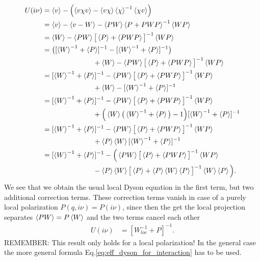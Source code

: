 \documentclass[12pt,a4paper]{scrartcl}
\numberwithin{equation}{section}
\begin{document}
\begin{align}
 U(i\nu) 
 &= \braket{v} - \left( \braket{ v \chi v } - \braket{v \chi} \braket{\chi}^{-1} \braket{\chi v} \right) \\
% 
 &= \braket{v} - \braket{v -W} - \braket{PW} \braket{P+PWP}^{-1} \braket{WP}  \\
%
 &= \braket{W} - \braket{PW} \big[ \braket{P}+\braket{PWP} \big]^{-1} \braket{WP}  \\
%
 &= \big( [\braket{W}^{-1}+\braket{P}]^{-1} -[\braket{W}^{-1}+\braket{P}]^{-1} \big) \nonumber \\
     & \hspace{2.5cm} +\braket{W} - \braket{PW} \big[ \braket{P}+\braket{PWP} \big]^{-1} \braket{WP}  \\
%
 &= [\braket{W}^{-1}+\braket{P}]^{-1} - \braket{PW} \big[ \braket{P}+\braket{PWP} \big]^{-1} \braket{WP} \nonumber \\
     & \hspace{2.5cm} +\braket{W} -[\braket{W}^{-1}+\braket{P}]^{-1}   \\
% 
 &= [\braket{W}^{-1}+\braket{P}]^{-1} - \braket{PW} \big[ \braket{P}+\braket{PWP} \big]^{-1} \braket{WP} \nonumber \\
     & \hspace{2.5cm} + \Big(  \braket{W} \big( \braket{W}^{-1}+\braket{P} \big) - 1  \Big) [\braket{W}^{-1}+\braket{P}]^{-1}   \\
% 
&= [\braket{W}^{-1}+\braket{P}]^{-1} - \braket{PW} \big[ \braket{P}+\braket{PWP} \big]^{-1} \braket{WP} \nonumber \\
     & \hspace{2.5cm} + \braket{P}\braket{W} [\braket{W}^{-1}+\braket{P}]^{-1}   \\
%
&= [\braket{W}^{-1}+\braket{P}]^{-1} - \Big( \braket{PW} \big[ \braket{P}+\braket{PWP} \big]^{-1} \braket{WP} \nonumber \\
     & \hspace{2.5cm} - \braket{P}\braket{W} \big[\braket{P}+\braket{P}\braket{W}\braket{P} \big]^{-1} \braket{W} \braket{P} \Big) .
\end{align}
We see that we obtain the usual local Dyson equation in the first term, but
two additional correction terms. These correction terms vanish
in case of a purely local polarization $P(q,i\nu)=P(i\nu)$, since
then the get the local projection separates $\braket{PW}=P \braket{W}$ and the two 
terms cancel each other
\begin{align}
 U(i\nu) &=  \left[ W^{-1}_{loc} + P \right]^{-1}.
\end{align}
REMEMBER: This result only holds for a local polarization! In the general case the more general formula 
Eq.\eqref{eq:eff_dyson_for_interaction} has to be used.
\end{document}
